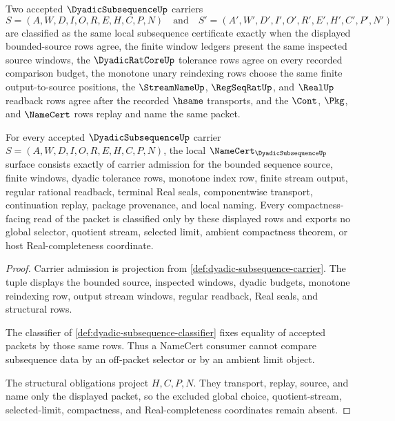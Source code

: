 \begin{definition}
\label{def:dyadic-subsequence-classifier}
Two accepted $\DyadicSubsequenceUp$ carriers
$$
S=(A,W,D,I,O,R,E,H,C,P,N)
\quad\text{and}\quad
S'=(A',W',D',I',O',R',E',H',C',P',N')
$$
are classified as the same local subsequence certificate exactly when the displayed bounded-source rows agree, the finite window ledgers present the same inspected source windows, the $\DyadicRatCoreUp$ tolerance rows agree on every recorded comparison budget, the monotone unary reindexing rows choose the same finite output-to-source positions, the $\StreamNameUp$, $\RegSeqRatUp$, and $\RealUp$ readback rows agree after the recorded $\hsame$ transports, and the $\Cont$, $\Pkg$, and $\NameCert$ rows replay and name the same packet.
\end{definition}

\begin{theorem}
\label{thm:dyadic-subsequence-namecert-obligations}
For every accepted $\DyadicSubsequenceUp$ carrier $S=(A,W,D,I,O,R,E,H,C,P,N)$, the local $\NameCert_{\DyadicSubsequenceUp}$ surface consists exactly of carrier admission for the bounded sequence source, finite windows, dyadic tolerance rows, monotone index row, finite stream output, regular rational readback, terminal Real seals, componentwise transport, continuation replay, package provenance, and local naming. Every compactness-facing read of the packet is classified only by these displayed rows and exports no global selector, quotient stream, selected limit, ambient compactness theorem, or host Real-completeness coordinate.
\end{theorem}
\begin{proof}
Carrier admission is projection from \autoref{def:dyadic-subsequence-carrier}. The tuple displays the bounded source, inspected windows, dyadic budgets, monotone reindexing row, output stream windows, regular readback, Real seals, and structural rows.

The classifier of \autoref{def:dyadic-subsequence-classifier} fixes equality of accepted packets by those same rows. Thus a NameCert consumer cannot compare subsequence data by an off-packet selector or by an ambient limit object.

The structural obligations project $H,C,P,N$. They transport, replay, source, and name only the displayed packet, so the excluded global choice, quotient-stream, selected-limit, compactness, and Real-completeness coordinates remain absent.
\end{proof}

